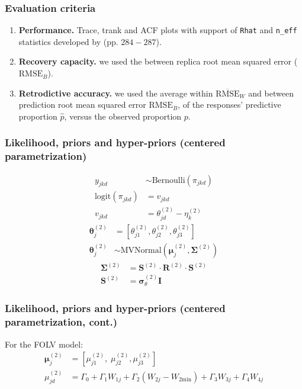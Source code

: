 \documentclass[arial,12pt,xcolor=dvipsnames]{beamer}
\begin{document}
%
\begin{frame}
	\frametitle{Evaluation criteria}
	\begin{enumerate}
		\item \textbf{Performance.} Trace, trank and ACF plots with support of \texttt{Rhat} and \texttt{n\_eff} statistics developed by \citet{Gelman_et_al_2014} (pp. $284-287$).
		\item \textbf{Recovery capacity.} we used the between replica root mean squared error ($\text{RMSE}_{B}$).
		\item \textbf{Retrodictive accuracy.} we used the average within $\overline{\text{RMSE}}_{W}$ and between prediction root mean squared error $\text{RMSE}_{B}$, of the responses' predictive proportion $\hat{p}$, versus the observed proportion $p$.
	\end{enumerate} 
\end{frame}
%
\begin{frame}
	\frametitle{Likelihood, priors and hyper-priors
		(centered parametrization)}
	\begin{align}
		y_{jkd} &\sim \text{Bernoulli}( \pi_{jkd} ) \\
		\text{logit}( \pi_{jkd} ) &= v_{jkd} \\
		v_{jkd} &= \theta^{(2)}_{jd} - \eta^{(2)}_{k}
	\end{align}
	\begin{align}
		\boldsymbol{\theta}^{(2)}_{j} &= \left[ \theta_{j1}^{(2)}, \theta_{j2}^{(2)}, \theta_{j3}^{(2)} \right] \\
		\boldsymbol{\theta}^{(2)}_{j} &\sim \text{MVNormal} \left( \boldsymbol{\mu}^{(2)}_{j}, \boldsymbol{\Sigma}^{(2)} \right) \label{eq:theta_sub}
	\end{align}
	\begin{align} \label{eq:sigma_factoring}
		\boldsymbol{\Sigma}^{(2)} &= \boldsymbol{S}^{(2)} \cdot \boldsymbol{R}^{(2)} \cdot \boldsymbol{S}^{(2)} \\
		\boldsymbol{S}^{(2)} &= \pmb{\sigma}^{(2)}_{\theta} \mathbf{I}
	\end{align}
\end{frame}
%
\begin{frame}
	\frametitle{Likelihood, priors and hyper-priors
		(centered parametrization, cont.)}
	For the FOLV model:
	\begin{align}
		\boldsymbol{\mu}^{(2)}_{j} &= \left[ \mu^{(2)}_{j1}, \; \mu^{(2)}_{j2}, \mu^{(2)}_{j3} \right] \label{eq:mu_FOLV} \\
		\mu^{(2)}_{jd} &= \Gamma_{0} + \Gamma_{1} W_{1j} + \Gamma_{2} (W_{2j} - W_{2\text{min}}) + \Gamma_{3} W_{3j} + \Gamma_{4} W_{4j}
	\end{align}
\end{frame}
\end{document}
